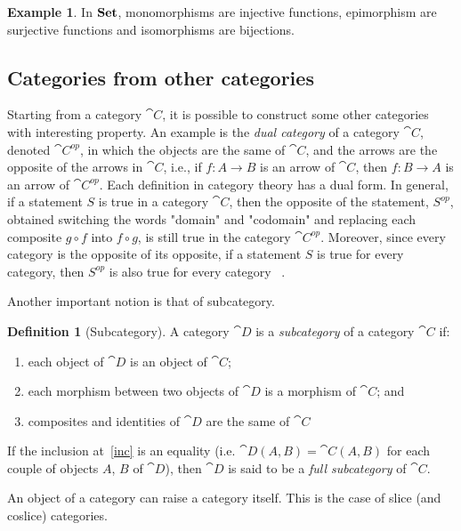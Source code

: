 \documentclass[a4paper, twoside,openright]{report}
\theoremstyle{plain}
\theoremstyle{definition}
\newtheorem{definition}[theorem]{Definition}
\newtheorem{example}[theorem]{Example}
\begin{document}
\begin{example}
    In $\mathbf{Set}$, monomorphisms are injective functions, epimorphism are surjective functions and isomorphisms are bijections.
\end{example}

\subsection{Categories from other categories}

Starting from a category $\cat{C}$, it is possible to construct some other categories with interesting property.
An example is the \emph{dual category} of a category $\cat{C}$, denoted $\cat{C}^{op}$, in which the objects are the same of $\cat{C}$, and the arrows are the opposite of the arrows in $\cat{C}$, i.e., if $f: A \rightarrow B$ is an arrow of $\cat{C}$, then $f: B \rightarrow A$ is an arrow of $\cat{C}^{op}$.
Each definition in category theory has a dual form. In general, if a statement $S$ is true in a category $\cat{C}$, then the opposite of the statement, $S^{op}$, obtained switching the words "domain" and "codomain" and replacing each composite $g \circ f$ into $f \circ g$, is still true in the category $\cat{C}^{op}$. Moreover, since every category is the opposite of its opposite, if a statement $S$ is true for every category, then $S^{op}$ is also true for every category ~\cite{pierce91}.

Another important notion is that of subcategory.
\begin{definition}[Subcategory]
    A category $\cat{D}$ is a \emph{subcategory} of a category $\cat{C}$ if:
    \begin{enumerate}
        \item each object of $\cat{D}$ is an object of $\cat{C}$;
        \item \label{inc} each morphism between two objects of $\cat{D}$ is a morphism of $\cat{C}$; and
        \item composites and identities of $\cat{D}$ are the same of $\cat{C}$
    \end{enumerate}

    If the inclusion at~\ref{inc} is an equality (i.e. $\cat{D}(A, B) = \cat{C}(A, B)$ for each couple of objects $A$, $B$ of $\cat{D}$), then $\cat{D}$ is said to be a \emph{full subcategory} of $\cat{C}$.
\end{definition}

An object of a category can raise a category itself. This is the case of slice (and coslice) categories.
\end{document}
